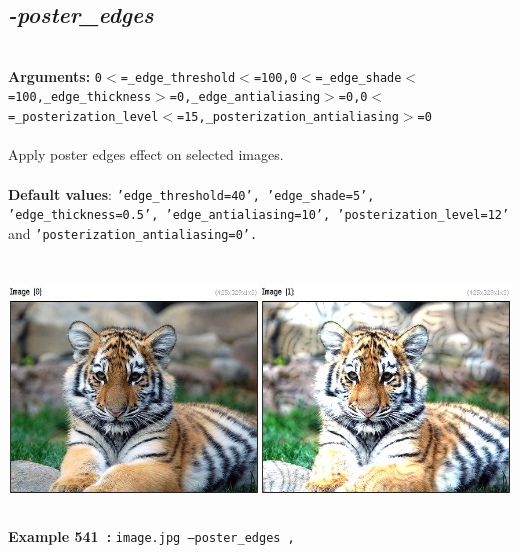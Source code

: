 \documentclass[a4paper,11pt,twoside]{book}
\begin{document}
\subsection{\emph{-poster\_edges} }\vspace*{-0.5em}
~\\\textbf{Arguments: } 
{\small \texttt{0$<$=\_edge\_threshold$<$=100,0$<$=\_edge\_shade$<$=100,\_edge\_thickness$>$=0,\_edge\_antialiasing$>$=0,0$<$=\_posterization\_level$<$=15,\_posterization\_antialiasing$>$=0}}\\~\\
Apply poster edges effect on selected images.
~\\~\\\textbf{Default values}: {\small \texttt{'edge\_threshold=40', 'edge\_shade=5', 'edge\_thickness=0.5', 'edge\_antialiasing=10', 'posterization\_level=12'} and \texttt{'posterization\_antialiasing=0'.}}
\begin{center}\includegraphics[keepaspectratio=true,height=7cm,width=\textwidth]{img/gmic_def541.jpg}\\
{\footnotesize \textbf{Example 541~:} \texttt{image.jpg --poster\_edges ,}}
\end{center}
\end{document}
